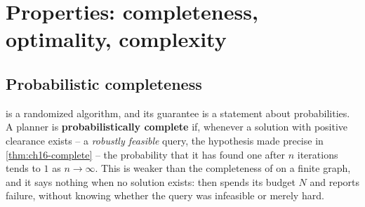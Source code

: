 \section{Properties: completeness, optimality, complexity}
\label{sec:ch16-properties}

\subsection{Probabilistic completeness}
\label{sec:ch16-completeness}

\rrt is a randomized algorithm, and its guarantee is a statement about
probabilities. A planner is \textbf{probabilistically
complete}
if, whenever a solution with positive clearance exists -- a \emph{robustly
feasible} query, the hypothesis made precise in \cref{thm:ch16-complete} --
the probability that it has found one after $n$ iterations tends to $1$ as
$n\to\infty$. This is weaker than the
completeness of \astar on a finite graph, and it says nothing when no
solution exists: \rrt then spends its budget $N$ and reports failure,
without knowing whether the query was infeasible or merely hard.

